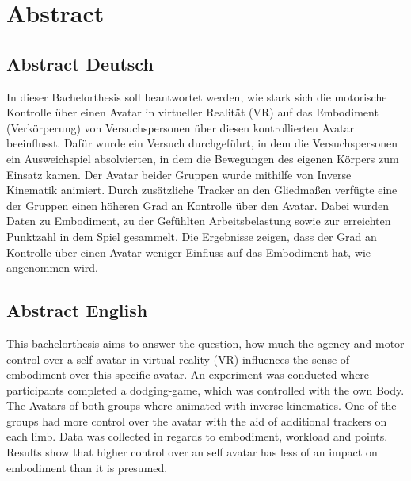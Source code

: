 \chapter*{Abstract}

\section*{Abstract Deutsch}
In dieser Bachelorthesis soll beantwortet werden, wie stark sich die motorische Kontrolle über einen Avatar in virtueller Realität (VR) auf das Embodiment (Verkörperung) von Versuchspersonen über diesen kontrollierten Avatar beeinflusst. Dafür wurde ein Versuch durchgeführt, in dem die Versuchspersonen ein Ausweichspiel absolvierten, in dem die Bewegungen des eigenen Körpers zum Einsatz kamen. Der Avatar beider Gruppen wurde mithilfe von Inverse Kinematik animiert. Durch zusätzliche Tracker an den Gliedmaßen verfügte eine der Gruppen einen höheren Grad an Kontrolle über den Avatar. Dabei wurden Daten zu Embodiment, zu der Gefühlten Arbeitsbelastung sowie zur erreichten Punktzahl in dem Spiel gesammelt. Die Ergebnisse zeigen, dass der Grad an Kontrolle über einen Avatar weniger Einfluss auf das Embodiment hat, wie angenommen wird.


\section*{Abstract English}
This bachelorthesis aims to answer the question, how much the agency and motor control over a self avatar in virtual reality (VR) influences the sense of embodiment over this specific avatar. An experiment was conducted where participants completed a dodging-game, which was controlled with the own Body. The Avatars of both groups where animated with inverse kinematics. One of the groups had more control over the avatar with the aid of additional trackers on each limb. Data was collected in regards to embodiment, workload and points. Results show that higher control over an self avatar has less of an impact on embodiment than it is presumed.